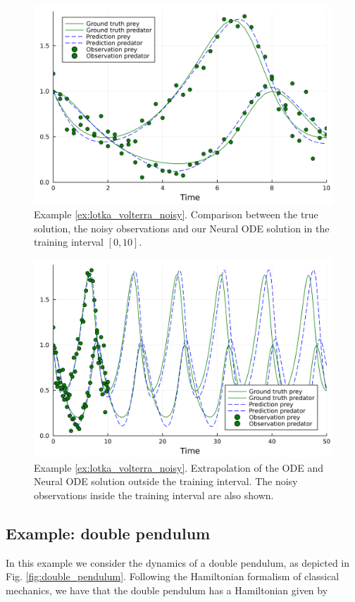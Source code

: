 \documentclass[final,onefignum,onetabnum]{siamart220329}
\newcounter{example}
\begin{document}
\begin{figure}[h!]
	\centering
	\includegraphics[width=0.5\linewidth]{../examples/lotka_volterra_noisy/comparison_01}
	\caption{Example \ref{ex:lotka_volterra_noisy}. Comparison between the true solution, the noisy observations and our Neural ODE solution in the training interval $[0,10]$.}
	\label{fig:lotka_volterra_noisy_comparison}
\end{figure}

\begin{figure}[h!]
	\centering
	\includegraphics[width=0.5\linewidth]{../examples/lotka_volterra_noisy/extrapolation_01}
	\caption{Example \ref{ex:lotka_volterra_noisy}. Extrapolation of the ODE and Neural ODE solution outside the training interval. The noisy observations inside the training interval are also shown.}
	\label{fig:lotka_volterra_noisy_extrapolation}
\end{figure}

\subsection{Example: double pendulum}\label{ex:double_pendulum}
In this example we consider the dynamics of a double pendulum, as depicted in Fig. \ref{fig:double_pendulum}. Following the Hamiltonian formalism of classical mechanics, we have that the double pendulum has a Hamiltonian given by
\end{document}
